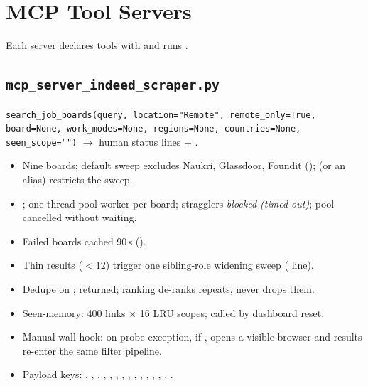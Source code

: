 \documentclass[11pt,a4paper]{article}
\newcommand{\file}[1]{\texttt{\small #1}}
\newcommand{\tool}[1]{\texttt{#1}}
\begin{document}
\section{MCP Tool Servers}
\label{sec:mcp}

Each server declares tools with  and runs
.

\subsection{\file{mcp\_server\_indeed\_scraper.py}}
\tool{search\_job\_boards(query, location="Remote", remote\_only=True,
board=None, work\_modes=None, regions=None, countries=None,
seen\_scope="")} $\rightarrow$ human status lines + .

\begin{itemize}[leftmargin=2em]
  \item Nine boards; default sweep excludes Naukri, Glassdoor, Foundit
        ();  (or an alias)
        restricts the sweep.
  \item {}; one thread-pool worker per board;
        stragglers \emph{blocked (timed out)}; pool cancelled without
        waiting.
  \item Failed boards cached 90\,s ().
  \item Thin results ($<12$) trigger one sibling-role widening sweep
        (\code{[ALSO]} line).
  \item Dedupe on ; 
        returned; ranking de-ranks repeats, never drops them.
  \item Seen-memory: 400 links $\times$ 16 LRU scopes;
         called by dashboard reset.
  \item Manual wall hook: on probe exception, if
        ,  opens a
        visible browser and results re-enter the same filter pipeline.
  \item Payload keys: , ,
        , , ,
        , , ,
        , , ,
        , , ,
        .
\end{itemize}
\end{document}

